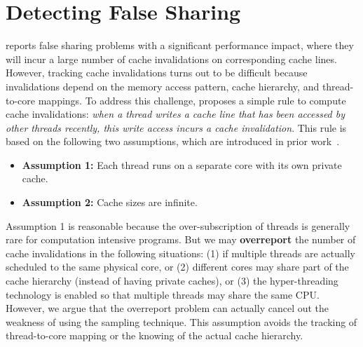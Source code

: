\section{Detecting False Sharing}
\label{sec:detect}

\cheetah{} reports false sharing problems with a significant performance impact, where they will incur a large number of cache invalidations on corresponding cache lines. However, tracking cache invalidations turns out to be difficult because invalidations depend on the memory access pattern, cache hierarchy, and thread-to-core mappings. 
To address this challenge, \cheetah{} proposes a simple rule to compute cache invalidations: \emph{when a thread writes a cache line that has been accessed by other threads recently, this write access incurs a cache invalidation}. This rule is based on the following two assumptions, which are introduced in prior work~\cite{Predator, qinzhao}. 
 

\begin{itemize} 
\item {\bf Assumption 1:} Each thread runs on a separate core with its own private cache. 

\item {\bf Assumption 2: } Cache sizes are infinite. 
 
\end{itemize}

Assumption 1 is reasonable because the over-subscription of threads is generally rare for computation intensive programs. But we may {\bf overreport} the number of cache invalidations in the following situations: (1) if multiple threads are actually scheduled to the same physical core, or (2) different cores may share part of the cache hierarchy (instead of having private caches), or (3) the hyper-threading technology is enabled so that multiple threads may share the same CPU. However, we argue that the overreport problem can actually cancel out the weakness of using the sampling technique. 
This assumption avoids the tracking of thread-to-core mapping or the knowing of the actual cache hierarchy.

